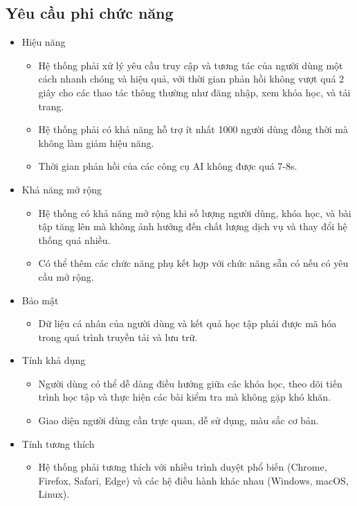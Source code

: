 \subsection{Yêu cầu phi chức năng}
\begin{itemize}
    \item Hiệu năng
    \begin{itemize}
    \item Hệ thống phải xử lý yêu cầu truy cập và tương tác của người dùng một cách nhanh chóng và hiệu quả, với thời gian phản hồi không vượt quá 2 giây cho các thao tác thông thường như đăng nhập, xem khóa học, và tải trang.
    \item Hệ thống phải có khả năng hỗ trợ ít nhất 1000 người dùng đồng thời mà không làm giảm hiệu năng.
    \item Thời gian phản hồi của các công cụ AI không được quá 7-8s.
\end{itemize}
    \item Khả năng mở rộng
    \begin{itemize}
    \item Hệ thống có khả năng mở rộng khi số lượng người dùng, khóa học, và bài tập tăng lên mà không ảnh hưởng đến chất lượng dịch vụ và thay đổi hệ thống quá nhiều.
    \item Có thể thêm các chức năng phụ kết hợp với chức năng sẵn có nếu có yêu cầu mở rộng.
\end{itemize}
    \item Bảo mật
    \begin{itemize}
    \item Dữ liệu cá nhân của người dùng và kết quả học tập phải được mã hóa trong quá trình truyền tải và lưu trữ.
\end{itemize}
    \item Tính khả dụng
    \begin{itemize}
    \item Người dùng có thể dễ dàng điều hướng giữa các khóa học, theo dõi tiến trình học tập và thực hiện các bài kiểm tra mà không gặp khó khăn.
    \item Giao diện người dùng cần trực quan, dễ sử dụng, màu sắc cơ bản.
\end{itemize}
    \item Tính tương thích
    \begin{itemize}
    \item Hệ thống phải tương thích với nhiều trình duyệt phổ biến (Chrome, Firefox, Safari, Edge) và các hệ điều hành khác nhau (Windows, macOS, Linux).
\end{itemize}
\end{itemize}
\newpage
